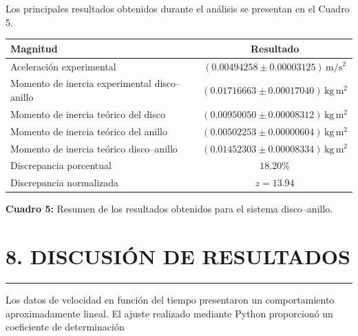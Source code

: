 \documentclass[11pt,a4paper]{article}
\newcommand{\sectionline}{%
    \vspace{-0.6em}
    \noindent\rule{\textwidth}{0.5pt}
    \vspace{0.5em}
}
\begin{document}
Los principales resultados obtenidos durante el análisis se presentan
en el Cuadro 5.

\begin{table}[h!]
\centering
\renewcommand{\arraystretch}{1.35}

\begin{tabular}{lc}
\hline
\textbf{Magnitud} & \textbf{Resultado} \\
\hline

Aceleración experimental
&
\((0.00494258\pm0.00003125)\,\mathrm{m/s^2}\)
\\

Momento de inercia experimental disco--anillo
&
\((0.01716663\pm0.00017040)\,\mathrm{kg\,m^2}\)
\\

Momento de inercia teórico del disco
&
\((0.00950050\pm0.00008312)\,\mathrm{kg\,m^2}\)
\\

Momento de inercia teórico del anillo
&
\((0.00502253\pm0.00000604)\,\mathrm{kg\,m^2}\)
\\

Momento de inercia teórico disco--anillo
&
\((0.01452303\pm0.00008334)\,\mathrm{kg\,m^2}\)
\\

Discrepancia porcentual
&
\(18.20\%\)
\\

Discrepancia normalizada
&
\(z=13.94\)
\\

\hline
\end{tabular}

\vspace{0.2cm}

\textbf{Cuadro 5:} Resumen de los resultados obtenidos para el sistema
disco--anillo.

\end{table}


\newpage
\section*{8. DISCUSIÓN DE RESULTADOS}
\sectionline

Los datos de velocidad en función del tiempo presentaron un
comportamiento aproximadamente lineal. El ajuste realizado mediante
Python proporcionó un coeficiente de determinación
\end{document}
